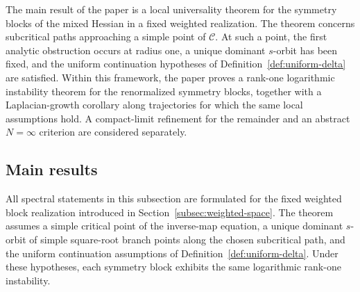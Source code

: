 \documentclass[11pt]{amsart}
\numberwithin{equation}{section}
\theoremstyle{plain}
\theoremstyle{definition}
\theoremstyle{remark}
\begin{document}
The main result of the paper is a local universality theorem for the symmetry
blocks of the mixed Hessian in a fixed weighted realization. The theorem concerns subcritical paths approaching a simple point of
 \(\mathcal C\). At such a point, the first analytic obstruction occurs at
radius one, a unique dominant
$s$-orbit has been fixed, and the uniform
continuation hypotheses of Definition~\ref{def:uniform-delta} are satisfied. Within this framework, the
paper proves a rank-one logarithmic instability theorem for the renormalized
symmetry blocks, together with a Laplacian-growth corollary along trajectories
for which the same local assumptions hold. A compact-limit refinement
for the remainder and an abstract \(N=\infty\) criterion are considered
separately.


\subsection{Main results}
\label{subsec:main-results}

All spectral statements in this subsection are formulated for the fixed
weighted block realization introduced in
Section~\ref{subsec:weighted-space}. The theorem assumes a
simple critical point of the inverse-map equation, a unique dominant
\(s\)-orbit of simple square-root branch points along the chosen subcritical
path, and the uniform continuation assumptions of
Definition~\ref{def:uniform-delta}. Under these hypotheses, each symmetry
block exhibits the same logarithmic rank-one instability.
\end{document}
